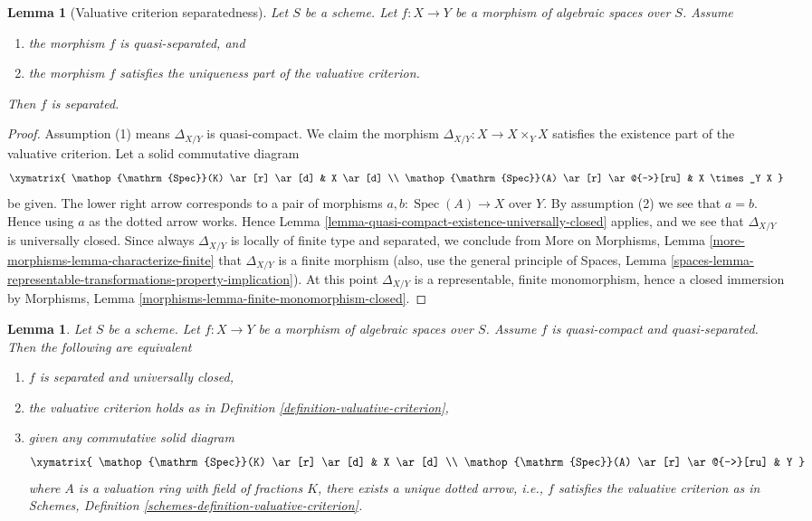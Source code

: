 \documentclass{stacks-project}
\theoremstyle{plain}
\newtheorem{lemma}[subsection]{Lemma}
\theoremstyle{definition}
\theoremstyle{remark}
\numberwithin{equation}{subsection}
\def\Spec{\mathop{\mathrm{Spec}}}
\begin{document}
\begin{lemma}[Valuative criterion separatedness]
\label{lemma-valuative-criterion-separatedness}
Let $S$ be a scheme.
Let $f : X \to Y$ be a morphism of algebraic spaces over $S$.
Assume
\begin{enumerate}
\item the morphism $f$ is quasi-separated, and
\item the morphism $f$ satisfies the uniqueness
part of the valuative criterion.
\end{enumerate}
Then $f$ is separated.
\end{lemma}

\begin{proof}
Assumption (1) means $\Delta_{X/Y}$ is quasi-compact.
We claim the morphism
$\Delta_{X/Y} : X \to X \times_Y X$ satisfies the existence
part of the valuative criterion.
Let a solid commutative diagram
$$
\xymatrix{
\Spec(K) \ar[r] \ar[d] & X \ar[d] \\
\Spec(A) \ar[r] \ar@{-->}[ru] & X \times_Y X
}
$$
be given. The lower right arrow corresponds to a
pair of morphisms $a, b : \Spec(A) \to X$ over $Y$.
By assumption (2) we see that $a = b$. Hence using $a$ as the dotted
arrow works. Hence
Lemma \ref{lemma-quasi-compact-existence-universally-closed}
applies, and we see that $\Delta_{X/Y}$ is universally closed.
Since always $\Delta_{X/Y}$ is locally of finite type and
separated, we conclude from
More on Morphisms, Lemma \ref{more-morphisms-lemma-characterize-finite}
that $\Delta_{X/Y}$ is a finite morphism (also, use the
general principle of
Spaces, Lemma
\ref{spaces-lemma-representable-transformations-property-implication}).
At this point $\Delta_{X/Y}$ is a representable, finite monomorphism,
hence a closed immersion by
Morphisms, Lemma \ref{morphisms-lemma-finite-monomorphism-closed}.
\end{proof}

\begin{lemma}
\label{lemma-characterize-separated-and-universally-closed}
Let $S$ be a scheme. Let $f : X \to Y$ be a morphism of algebraic spaces
over $S$. Assume $f$ is quasi-compact and quasi-separated. Then the
following are equivalent
\begin{enumerate}
\item $f$ is separated and universally closed,
\item the valuative criterion holds as in Definition
\ref{definition-valuative-criterion},
\item given any commutative solid diagram
$$
\xymatrix{
\Spec(K) \ar[r] \ar[d] & X \ar[d] \\
\Spec(A) \ar[r] \ar@{-->}[ru] & Y
}
$$
where $A$ is a valuation ring with field of fractions $K$, there exists
a unique dotted arrow, i.e., $f$ satisfies the valuative
criterion as in
Schemes, Definition \ref{schemes-definition-valuative-criterion}.
\end{enumerate}
\end{lemma}
\end{document}
